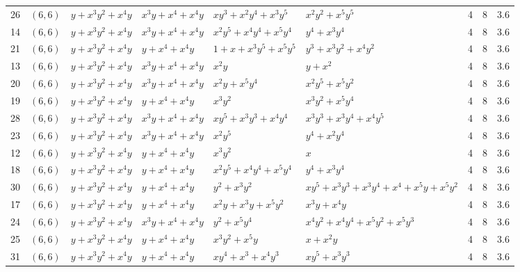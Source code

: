 \begin{table}[t]
\begin{tabular*}{\textwidth}{@{\extracolsep{\fill}}cllllllcc}
26 & $(6,6)$ & $y{+}x^{3}y^{2}{+}x^{4}y$ & $x^{3}y{+}x^{4}{+}x^{4}y$ & $xy^{3}{+}x^{2}y^{4}{+}x^{3}y^{5}$ & $x^{2}y^{2}{+}x^{5}y^{5}$ & 4 & 8 & 3.6 \\
14 & $(6,6)$ & $y{+}x^{3}y^{2}{+}x^{4}y$ & $x^{3}y{+}x^{4}{+}x^{4}y$ & $x^{2}y^{5}{+}x^{4}y^{4}{+}x^{5}y^{4}$ & $y^{4}{+}x^{3}y^{4}$ & 4 & 8 & 3.6 \\
21 & $(6,6)$ & $y{+}x^{3}y^{2}{+}x^{4}y$ & $y{+}x^{4}{+}x^{4}y$ & $1{+}x{+}x^{3}y^{5}{+}x^{5}y^{5}$ & $y^{3}{+}x^{3}y^{2}{+}x^{4}y^{2}$ & 4 & 8 & 3.6 \\
13 & $(6,6)$ & $y{+}x^{3}y^{2}{+}x^{4}y$ & $x^{3}y{+}x^{4}{+}x^{4}y$ & $x^{2}y$ & $y{+}x^{2}$ & 4 & 8 & 3.6 \\
20 & $(6,6)$ & $y{+}x^{3}y^{2}{+}x^{4}y$ & $x^{3}y{+}x^{4}{+}x^{4}y$ & $x^{2}y{+}x^{5}y^{4}$ & $x^{2}y^{5}{+}x^{5}y^{2}$ & 4 & 8 & 3.6 \\
19 & $(6,6)$ & $y{+}x^{3}y^{2}{+}x^{4}y$ & $y{+}x^{4}{+}x^{4}y$ & $x^{3}y^{2}$ & $x^{3}y^{2}{+}x^{5}y^{4}$ & 4 & 8 & 3.6 \\
28 & $(6,6)$ & $y{+}x^{3}y^{2}{+}x^{4}y$ & $x^{3}y{+}x^{4}{+}x^{4}y$ & $xy^{5}{+}x^{3}y^{3}{+}x^{4}y^{4}$ & $x^{3}y^{3}{+}x^{3}y^{4}{+}x^{4}y^{5}$ & 4 & 8 & 3.6 \\
23 & $(6,6)$ & $y{+}x^{3}y^{2}{+}x^{4}y$ & $x^{3}y{+}x^{4}{+}x^{4}y$ & $x^{2}y^{5}$ & $y^{4}{+}x^{2}y^{4}$ & 4 & 8 & 3.6 \\
12 & $(6,6)$ & $y{+}x^{3}y^{2}{+}x^{4}y$ & $y{+}x^{4}{+}x^{4}y$ & $x^{3}y^{2}$ & $x$ & 4 & 8 & 3.6 \\
18 & $(6,6)$ & $y{+}x^{3}y^{2}{+}x^{4}y$ & $y{+}x^{4}{+}x^{4}y$ & $x^{2}y^{5}{+}x^{4}y^{4}{+}x^{5}y^{4}$ & $y^{4}{+}x^{3}y^{4}$ & 4 & 8 & 3.6 \\
30 & $(6,6)$ & $y{+}x^{3}y^{2}{+}x^{4}y$ & $y{+}x^{4}{+}x^{4}y$ & $y^{2}{+}x^{3}y^{2}$ & $xy^{5}{+}x^{3}y^{3}{+}x^{3}y^{4}{+}x^{4}{+}x^{5}y{+}x^{5}y^{2}$ & 4 & 8 & 3.6 \\
17 & $(6,6)$ & $y{+}x^{3}y^{2}{+}x^{4}y$ & $y{+}x^{4}{+}x^{4}y$ & $x^{2}y{+}x^{3}y{+}x^{5}y^{2}$ & $x^{3}y{+}x^{4}y$ & 4 & 8 & 3.6 \\
24 & $(6,6)$ & $y{+}x^{3}y^{2}{+}x^{4}y$ & $x^{3}y{+}x^{4}{+}x^{4}y$ & $y^{2}{+}x^{5}y^{4}$ & $x^{4}y^{2}{+}x^{4}y^{4}{+}x^{5}y^{2}{+}x^{5}y^{3}$ & 4 & 8 & 3.6 \\
25 & $(6,6)$ & $y{+}x^{3}y^{2}{+}x^{4}y$ & $y{+}x^{4}{+}x^{4}y$ & $x^{3}y^{2}{+}x^{5}y$ & $x{+}x^{2}y$ & 4 & 8 & 3.6 \\
31 & $(6,6)$ & $y{+}x^{3}y^{2}{+}x^{4}y$ & $y{+}x^{4}{+}x^{4}y$ & $xy^{4}{+}x^{3}{+}x^{4}y^{3}$ & $xy^{5}{+}x^{3}y^{3}$ & 4 & 8 & 3.6 \\

\end{tabular*}
\end{table}
